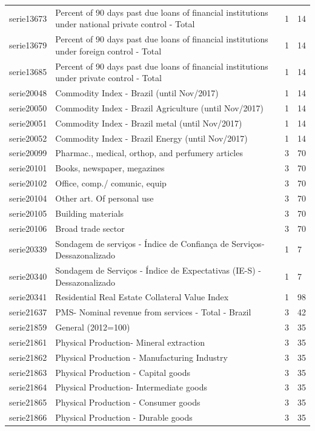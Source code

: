 \documentclass{article}
\begin{document}
{\begin{landscape}
\begin{center}
\begin{longtable}{|l|l|l|l|}
serie13673 & Percent of 90 days past due loans of financial institutions under national private control - Total & 1 & 14 \\
serie13679 & Percent of 90 days past due loans of financial institutions under foreign control - Total & 1 & 14 \\
serie13685 & Percent of 90 days past due loans of financial institutions under private control - Total & 1 & 14 \\
serie20048 & Commodity Index - Brazil (until Nov/2017) & 1 & 14 \\
serie20050 & Commodity Index - Brazil Agriculture (until Nov/2017) & 1 & 14 \\
serie20051 & Commodity Index - Brazil metal (until Nov/2017) & 1 & 14 \\
serie20052 & Commodity Index - Brazil Energy (until Nov/2017) & 1 & 14 \\
serie20099 & Pharmac., medical, orthop, and perfumery articles & 3 & 70 \\
serie20101 & Books, newspaper, megazines & 3 & 70 \\
serie20102 & Office, comp./ comunic, equip & 3 & 70 \\
serie20104 & Other art. Of personal use & 3 & 70 \\
serie20105 & Building materials & 3 & 70 \\
serie20106 & Broad trade sector & 3 & 70 \\
serie20339 & Sondagem de serviços - Índice de Confiança de Serviços- Dessazonalizado & 1 & 7 \\
serie20340 & Sondagem de Serviços - Índice de Expectativas (IE-S) - Dessazonalizado & 1 & 7 \\
serie20341 & Residential Real Estate Collateral Value Index & 1 & 98 \\
serie21637 & PMS- Nominal revenue from services - Total - Brazil & 3 & 42 \\
serie21859 & General (2012=100) & 3 & 35 \\
serie21861 & Physical Production- Mineral extraction & 3 & 35 \\
serie21862 & Physical Production - Manufacturing Industry & 3 & 35 \\
serie21863 & Physical Production - Capital goods & 3 & 35 \\
serie21864 & Physical Production- Intermediate goods & 3 & 35 \\
serie21865 & Physical Production - Consumer goods & 3 & 35 \\
serie21866 & Physical Production - Durable goods & 3 & 35 \\

\end{longtable}
\end{center}
\end{landscape}}
\end{document}
